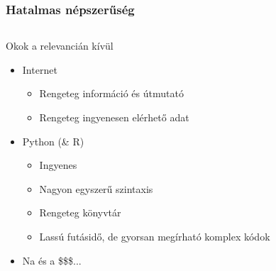 \begin{frame}
\frametitle{Hatalmas népszerűség}

\pause

\begin{columns}
\begin{column}{0.45\textwidth}
	\begin{block}{Okok a relevancián kívül}
		\begin{itemize}
			\item<2-> Internet
			\begin{itemize}
				\item Rengeteg információ és útmutató
				\item Rengeteg ingyenesen elérhető adat
			\end{itemize}
			\item<3-> Python (\& R)
			\begin{itemize}
				\item Ingyenes
				\item Nagyon egyszerű szintaxis
				\item Rengeteg könyvtár
				\item Lassú futásidő, de gyorsan megírható komplex kódok
			\end{itemize}			
			\item<4-> Na és a \$\$\$...
		\end{itemize}
	\end{block}
\end{column}
\begin{column}{0.45\textwidth}


\end{column}
\end{columns}
\end{frame}
